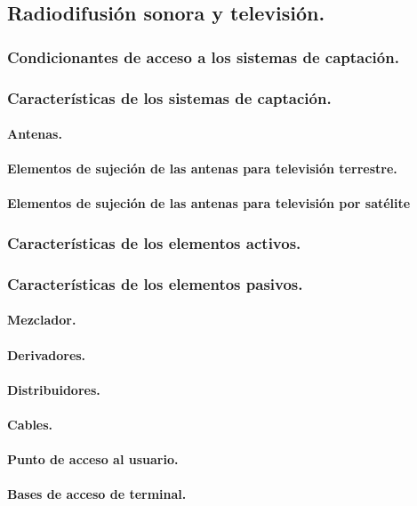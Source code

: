 \subsection{Radiodifusión sonora y televisión.}
\subsubsection{Condicionantes de acceso a los sistemas de captación.}
\subsubsection{Características de los sistemas de captación.}
\paragraph{Antenas.}
\paragraph{Elementos de sujeción de las antenas para televisión terrestre.}
\paragraph{Elementos de sujeción de las antenas para televisión por satélite}
\subsubsection{Características de los elementos activos.}
\subsubsection{Características de los elementos pasivos.}
\paragraph{Mezclador.}
\paragraph{Derivadores.}
\paragraph{Distribuidores.}
\paragraph{Cables.}
\paragraph{Punto de acceso al usuario.}
\paragraph{Bases de acceso de terminal.}